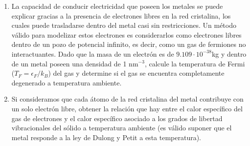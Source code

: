 \documentclass[a4paper,11pt]{article}
\begin{document}
\begin{enumerate}[label=(\alph*),
                  leftmargin=2\parindent,
                  rightmargin=2\parindent]
{          Si definimos $\Delta E = E(T) - E(T=0)$, el calor específico 
          puede calcularse como:
          $$
          C_V =
          \left( \frac{\partial \Delta E}{\partial T} \right)_{N, V},
          $$
          ya que restarle la energía del estado fundamental es 
          equivalente a un corrimiento rígido de la energía.
          
          Suponiendo que la cantidad de partículas en el gas no varía 
          significativamente para temperaturas cercanas al cero 
          absoluto, la diferencia entre $N(T)$ y $N(T=0)$ es 
          aproximadamente nula, y por ende puede ser introducida en la 
          expresión de $\Delta E$ (siendo previamente multiplicada por 
          $\epsilon_F$).
          Esta nueva expresión de $\Delta E$ es posible derivarla con 
          respecto a la temperatura para obtener una expresión del 
          calor específico.
          
          Demostrar entonces, que a través de este método obtenemos 
          el primer término del desarrollo de Sommerfeld:
          $$ C_V \simeq N k \frac{\pi^2}{2} \frac{kT}{\epsilon_F}. $$
         }
     
    \item{La capacidad de conducir electricidad que poseen los metales se 
          puede explicar gracias a la presencia de electrones libres en la 
          red cristalina, los cuales puede trasladarse dentro del metal casi 
          sin restricciones.
          Un método válido para modelizar estos electrones es 
          considerarlos como electrones libres dentro de un pozo de 
          potencial infinito, es decir, como un gas de fermiones no 
          interactuantes.
          Dado que la masa de un electrón es de $9.109 \cdot 
          10^{-38}$kg y dentro de un metal poseen una densidad de 1 
          nm$^{-3}$, calcule la temperatura de Fermi
          ($T_F = \epsilon_F/k_B$) del gas y determine si el gas se 
          encuentra completamente degenerado a temperatura ambiente.
          }
    
    \item{Si consideramos que cada átomo de la red cristalina del 
          metal contribuye con un solo electrón libre, obtener la relación 
          que hay entre el calor específico del gas de electrones y el calor 
          específico asociado a los grados de libertad vibracionales del 
          sólido a temperatura ambiente (es válido suponer que el metal 
          responde a la ley de Dulong y Petit a esta temperatura).
          }

\end{enumerate}
\end{document}
